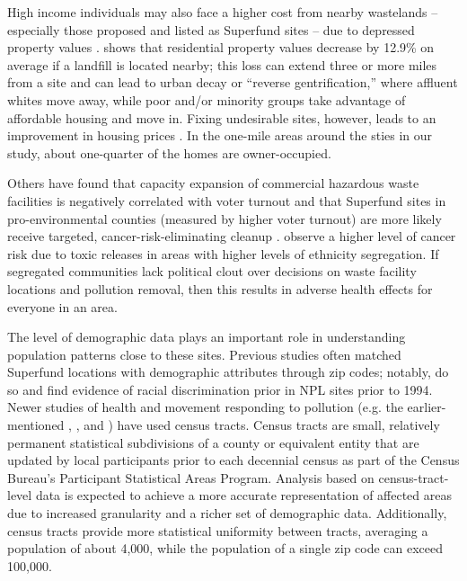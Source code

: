 \documentclass[12pt]{article}
\begin{document}
High income individuals may also face a higher cost from nearby wastelands -- especially those proposed and listed as Superfund sites -- due to depressed property values \parencite{McClelland1990}. \textcite{ready2010landfills} shows that residential property values decrease by 12.9\% on average if a landfill is located nearby; this loss can extend three or more miles from a site and can lead to urban decay or ``reverse gentrification,'' where affluent whites move away, while poor and/or minority groups take advantage of affordable housing and move in. Fixing undesirable sites, however, leads to an improvement in housing prices \parencite{Haninger2017}. In the one-mile areas around the sties in our study, about one-quarter of the homes are owner-occupied.

Others have found that capacity expansion of commercial hazardous waste facilities is negatively correlated with voter turnout \parencite{Hamilton1995} and that Superfund sites in pro-environmental counties (measured by higher voter turnout) are more likely receive targeted, cancer-risk-eliminating cleanup \parencite{hamilton1999calculating}. \textcite{Morello-Frosch2006} observe a higher level of cancer risk due to toxic releases in areas with higher levels of ethnicity segregation. If segregated communities lack political clout over decisions on waste facility locations and pollution removal, then this results in adverse health effects for everyone in an area. 

The level of demographic data plays an important role in understanding population patterns close to these sites. Previous studies often matched Superfund locations with demographic attributes through zip codes; notably, \textcite{burda2014environmental} do so and find evidence of racial discrimination prior in NPL sites prior to 1994. Newer studies of health and movement responding to pollution (e.g. the earlier-mentioned \textcite{Morello-Frosch2006}, \textcite{Gamper-Rabindran2013}, and \textcite{Depro2015}) have used census tracts. Census tracts are small, relatively permanent statistical subdivisions of a county or equivalent entity that are updated by local participants prior to each decennial census as part of the Census Bureau's Participant Statistical Areas Program. Analysis based on census-tract-level data is expected to achieve a more accurate representation of affected areas due to increased granularity \parencite{ProximityOne2019} and a richer set of demographic data. %
Additionally, census tracts provide more statistical uniformity between tracts, averaging a population of about 4,000, while the population of a single zip code can exceed 100,000. %
\end{document}
